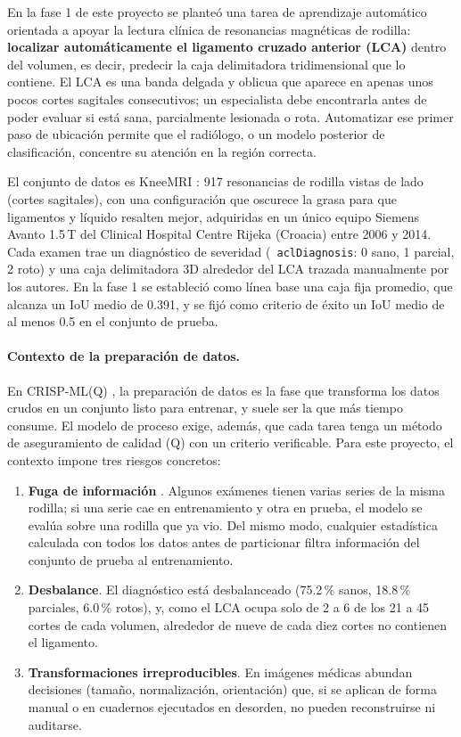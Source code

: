 \documentclass[12pt,letterpaper]{article}
\newcommand{\code}[1]{\texttt{\hyphenchar\font=-1 #1}}
\begin{document}
En la fase 1 de este proyecto se planteó una tarea de aprendizaje automático orientada a apoyar la lectura clínica de resonancias magnéticas de rodilla: \textbf{localizar automáticamente el ligamento cruzado anterior (LCA)} dentro del volumen, es decir, predecir la caja delimitadora tridimensional que lo contiene. El LCA es una banda delgada y oblicua que aparece en apenas unos pocos cortes sagitales consecutivos; un especialista debe encontrarla antes de poder evaluar si está sana, parcialmente lesionada o rota. Automatizar ese primer paso de ubicación permite que el radiólogo, o un modelo posterior de clasificación, concentre su atención en la región correcta.

El conjunto de datos es KneeMRI \cite{stajduhar2017semi,zenodo_kneemri}: 917 resonancias de rodilla vistas de lado (cortes sagitales), con una configuración que oscurece la grasa para que ligamentos y líquido resalten mejor, adquiridas en un único equipo Siemens Avanto 1.5\,T del Clinical Hospital Centre Rijeka (Croacia) entre 2006 y 2014. Cada examen trae un diagnóstico de severidad (\code{aclDiagnosis}: 0 sano, 1 parcial, 2 roto) y una caja delimitadora 3D alrededor del LCA trazada manualmente por los autores. En la fase 1 se estableció como línea base una caja fija promedio, que alcanza un IoU medio de 0.391, y se fijó como criterio de éxito un IoU medio de al menos 0.5 en el conjunto de prueba.

\paragraph{Contexto de la preparación de datos.} En CRISP-ML(Q) \cite{studer2021crispmlq}, la preparación de datos es la fase que transforma los datos crudos en un conjunto listo para entrenar, y suele ser la que más tiempo consume. El modelo de proceso exige, además, que cada tarea tenga un método de aseguramiento de calidad (Q) con un criterio verificable. Para este proyecto, el contexto impone tres riesgos concretos:

\begin{enumerate}[leftmargin=*]
  \item \textbf{Fuga de información} \cite{kaufman2012leakage}. Algunos exámenes tienen varias series de la misma rodilla; si una serie cae en entrenamiento y otra en prueba, el modelo se evalúa sobre una rodilla que ya vio. Del mismo modo, cualquier estadística calculada con todos los datos antes de particionar filtra información del conjunto de prueba al entrenamiento.
  \item \textbf{Desbalance}. El diagnóstico está desbalanceado (75.2\,\% sanos, 18.8\,\% parciales, 6.0\,\% rotos), y, como el LCA ocupa solo de 2 a 6 de los 21 a 45 cortes de cada volumen, alrededor de nueve de cada diez cortes no contienen el ligamento.
  \item \textbf{Transformaciones irreproducibles}. En imágenes médicas abundan decisiones (tamaño, normalización, orientación) que, si se aplican de forma manual o en cuadernos ejecutados en desorden, no pueden reconstruirse ni auditarse.
\end{enumerate}
\end{document}
